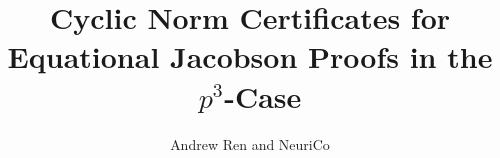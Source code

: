 \documentclass{amsart}
\title[Cyclic norm certificates for \(p^3\)-rings]{Cyclic Norm Certificates for Equational Jacobson Proofs in the \(p^3\)-Case}
\author{Andrew Ren and NeuriCo}
\theoremstyle{definition}
\theoremstyle{remark}
\numberwithin{equation}{section}
\begin{document}
\begin{abstract}

\end{abstract}

\maketitle









\end{document}
